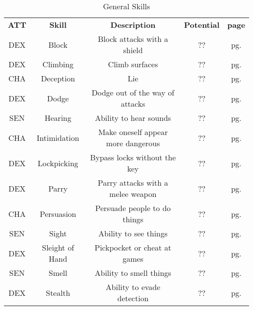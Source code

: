 


\begin{table}[h!]
    \begin{tabular}{c c c c c}
        \bfseries{ATT} & \bfseries{Skill} & \bfseries{Description} & \bfseries{Potential} & \bfseries{page} \\
        DEX & Block & Block attacks with a shield & ?? & pg. \pageref{skill:block} \\
        DEX & Climbing & Climb surfaces & ?? & pg. \pageref{skill:climbing} \\
        CHA & Deception & Lie & ?? & pg. \pageref{skill:deception} \\
        DEX & Dodge & Dodge out of the way of attacks & ?? & pg. \pageref{skill:dodge} \\
        SEN & Hearing & Ability to hear sounds & ?? & pg. \pageref{skill:hearing} \\
        CHA & Intimidation & Make oneself appear more dangerous & ?? & pg. \pageref{skill:intimidation} \\
        DEX & Lockpicking & Bypass locks without the key & ?? & pg. \pageref{skill:lockpicking} \\
        DEX & Parry & Parry attacks with a melee weapon & ?? & pg. \pageref{skill:parry} \\
        CHA & Persuasion & Persuade people to do things & ?? & pg. \pageref{skill:persuasion} \\
        SEN & Sight & Ability to see things & ?? & pg. \pageref{skill:sight} \\
        DEX & Sleight of Hand & Pickpocket or cheat at games & ?? & pg. \pageref{skill:sleight-of-hand} \\
        SEN & Smell & Ability to smell things & ?? & pg. \pageref{skill:smell} \\
        DEX & Stealth & Ability to evade detection & ?? & pg. \pageref{skill:stealth} \\
    \end{tabular}
    \label{tab:general-skills}
    \caption{General Skills}
\end{table}

